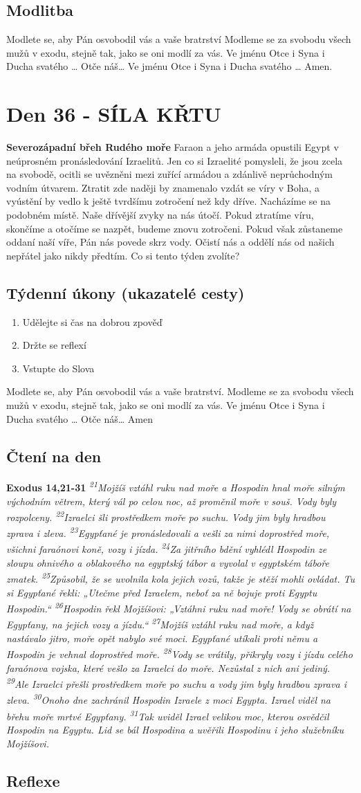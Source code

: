 \documentclass[11pt]{article}
\newcommand{\zacatekSestyTyden}{
  \textbf{Severozápadní břeh Rudého moře} \newline 
  Faraon a jeho armáda opustili Egypt v neúprosném pronásledování Izraelitů. Jen co si Izraelité pomysleli, že jsou zcela na svobodě, ocitli se uvězněni mezi zuřící armádou a zdánlivě neprůchodným vodním útvarem. Ztratit zde naději by znamenalo vzdát se víry v Boha, a vyústění by vedlo k ještě tvrdšímu zotročení než kdy dříve. Nacházíme se na podobném místě. Naše dřívější zvyky na nás útočí. Pokud ztratíme víru, skončíme a otočíme se nazpět, budeme znovu zotročeni. Pokud však zůstaneme oddaní naší víře, Pán nás povede skrz vody. Očistí nás a oddělí nás od našich nepřátel jako nikdy předtím. Co si tento týden zvolíte?

\subsection*{Týdenní úkony (ukazatelé cesty)}
\begin{enumerate}
  \item Udělejte si čas na dobrou zpověď
  \item Držte se reflexí
  \item Vstupte do Slova
\end{enumerate}
Modlete se, aby Pán osvobodil vás a vaše bratrství. \newline
Modleme se za svobodu všech mužů v exodu, stejně tak, jako se oni modlí za vás.\newline
Ve jménu Otce i Syna i Ducha svatého …  Otče náš… Amen
}
\begin{document}
\subsection*{Modlitba}
Modlete se, aby Pán osvobodil vás a vaše bratrství \newline
Modleme se za svobodu všech mužů v exodu, stejně tak, jako se oni modlí za vás.\newline
Ve jménu Otce i Syna i Ducha svatého … Otče náš… Ve jménu Otce i Syna i Ducha svatého … Amen.
\newpage
\newpage
\section{Den 36 - SÍLA KŘTU }
\zacatekSestyTyden
\subsection*{Čtení na den}
\textbf{Exodus 14,21-31}
\newline
\textit{
\textsuperscript{21}Mojžíš vztáhl ruku nad moře a Hospodin hnal moře silným východním větrem, který vál po celou noc, až proměnil moře v souš. Vody byly rozpolceny.
\textsuperscript{22}Izraelci šli prostředkem moře po suchu. Vody jim byly hradbou zprava i zleva.
\textsuperscript{23}Egypťané je pronásledovali a vešli za nimi doprostřed moře, všichni faraónovi koně, vozy i jízda.
\textsuperscript{24}Za jitřního bdění vyhlédl Hospodin ze sloupu ohnivého a oblakového na egyptský tábor a vyvolal v egyptském táboře zmatek.
\textsuperscript{25}Způsobil, že se uvolnila kola jejich vozů, takže je stěží mohli ovládat. Tu si Egypťané řekli: „Utečme před Izraelem, neboť za ně bojuje proti Egyptu Hospodin.“
\textsuperscript{26}Hospodin řekl Mojžíšovi: „Vztáhni ruku nad moře! Vody se obrátí na Egypťany, na jejich vozy a jízdu.“
\textsuperscript{27}Mojžíš vztáhl ruku nad moře, a když nastávalo jitro, moře opět nabylo své moci. Egypťané utíkali proti němu a Hospodin je vehnal doprostřed moře.
\textsuperscript{28}Vody se vrátily, přikryly vozy i jízdu celého faraónova vojska, které vešlo za Izraelci do moře. Nezůstal z nich ani jediný.
\textsuperscript{29}Ale Izraelci přešli prostředkem moře po suchu a vody jim byly hradbou zprava i zleva.
\textsuperscript{30}Onoho dne zachránil Hospodin Izraele z moci Egypta. Izrael viděl na břehu moře mrtvé Egypťany.
\textsuperscript{31}Tak uviděl Izrael velikou moc, kterou osvědčil Hospodin na Egyptu. Lid se bál Hospodina a uvěřili Hospodinu i jeho služebníku Mojžíšovi.
}

\subsection*{Reflexe}
\end{document}

